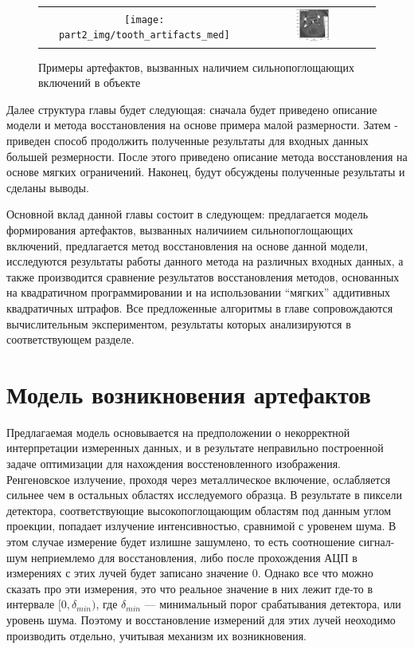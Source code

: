 \begin{figure}
\centering
\begin{tabular}{@{}c@{}c}
  \texttt{[image: part2\_img/tooth\_artifacts\_med]}
  &
  \includegraphics[width=0.3\textwidth]{../Presentation/images/high_absorb_artifacts}
\\
\end{tabular}
\caption{Примеры артефактов, вызванных наличием сильнопоглощающих включений в объекте}
\label{im:high_absorb_artifacts}
\end{figure}

Далее структура главы будет следующая: сначала будет приведено описание модели и метода восстановления на основе примера малой размерности.
Затем - приведен способ продолжить полученные результаты для входных данных большей резмерности.
После этого приведено описание метода восстановления на основе мягких ограничений.
Наконец, будут обсуждены полученные результаты и сделаны выводы.

Основной вклад данной главы состоит в следующем: предлагается модель формирования артефактов, вызванных наличиием сильнопоглощающих включений, предлагается метод восстановления на основе данной модели, исследуются результаты работы данного метода на различных входных данных, а также производится сравнение результатов восстановления методов, основанных на квадратичном программировании и на использовании ``мягких'' аддитивных квадратичных штрафов. 
Все предложенные алгоритмы в главе сопровождаются вычислительным экспериментом, результаты которых анализируются в соответствующем разделе.

\section{Модель возникновения артефактов}
\label{sect_2_0}

Предлагаемая модель основывается на предположении о некорректной интерпретации измеренных данных, и в результате неправильно построенной задаче оптимизации для нахождения восстеновленного изображения.
Ренгеновское излучение, проходя через металлическое включение, ослабляется сильнее чем в остальных областях исследуемого образца.
В результате в пиксели детектора, соответствующие высокопоглощающим областям под данным углом проекции, попадает излучение интенсивностью, сравнимой с уровенем шума.
В этом случае измерение будет излишне зашумлено, то есть соотношение сигнал-шум неприемлемо для восстановления, либо после прохождения АЦП в измерениях с этих лучей будет записано значение 0.
Однако все что можно сказать про эти измерения, это что реальное значение в них лежит где-то в интервале $[0, \delta_{min})$, где $\delta_{min}$ --- минимальный порог срабатывания детектора, или уровень шума.
Поэтому и восстановление измерений для этих лучей неоходимо производить отдельно, учитывая механизм их возникновения.

